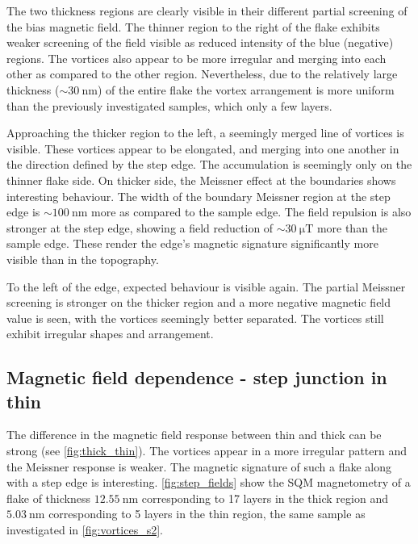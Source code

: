 The two thickness regions are clearly visible in their different partial screening of the bias magnetic field. The thinner region to the right of the flake exhibits weaker screening of the field visible as reduced intensity of the blue (negative) regions. The vortices also appear to be more irregular and merging into each other as compared to the other region. Nevertheless, due to the relatively large thickness ($\sim\qty{30}{\nano\meter}$) of the entire flake the vortex arrangement is more uniform than the previously investigated samples, which only a few layers. 

Approaching the thicker region to the left, a seemingly merged line of vortices is visible. These vortices appear to be elongated, and merging into one another in the direction defined by the step edge. The accumulation is seemingly only on the thinner flake side. On thicker side, the Meissner effect at the boundaries shows interesting behaviour. The width of the boundary Meissner region at the step edge is $\sim\qty{100}{\nano\meter}$ more as compared to the sample edge. The field repulsion is also stronger at the step edge, showing a field reduction of $\sim\qty{30}{\micro\tesla}$ more than the sample edge. These render the  edge's magnetic signature significantly more visible than in the topography. 

To the left of the edge, expected behaviour is visible again. The partial Meissner screening is stronger on the thicker region and a more negative magnetic field value is seen, with the vortices seemingly better separated. The vortices still exhibit irregular shapes and arrangement. 

\subsection*{Magnetic field dependence - step junction in thin }

The difference in the magnetic field response between thin and thick  can be strong (see \cref{fig:thick_thin}). The vortices appear in a more irregular pattern and the Meissner response is weaker. The magnetic signature of such a flake along with a step edge is interesting. \cref{fig:step_fields} show the \gls{SQM} magnetometry of a flake of thickness $\qty{12.55}{\nano\meter}$ corresponding to 17 layers in the thick region and $\qty{5.03}{\nano\meter}$ corresponding to 5 layers in the thin region, the same sample as investigated in \cref{fig:vortices_s2}. 

